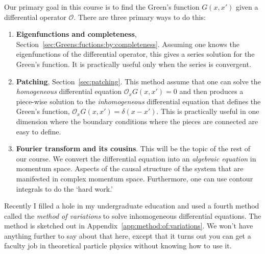 Our primary goal in this course is to find the Green's function $G(x,x')$ given a differential operator $\mathcal O$. There are three primary ways to do this:
\begin{enumerate}
\item \textbf{Eigenfunctions and completeness}, Section~\ref{sec:Greens:fuctions:by:completeness}. Assuming one knows the eigenfunctions of the differential operator, this gives a series solution for the Green's function. It is practically useful only when the series is convergent.

\item \textbf{Patching}, Section~\ref{sec:patching}. This method assume that one can solve the \emph{homogeneous} differential equation $\mathcal O_x G(x,x')=0$ and then produces a piece-wise solution to the \emph{inhomogeneous} differential equation that defines the Green's function, $\mathcal O_x G(x,x')=\delta(x-x')$. This is practically useful in one dimension where the boundary conditions where the pieces are connected are easy to define.

\item \textbf{Fourier transform and its cousins}. This will be the topic of the rest of our course. We convert the differential equation into an \emph{algebraic equation} in momentum space. Aspects of the causal structure of the system that are manifested in complex momentum space. Furthermore, one can use contour integrals to do the `hard work.'
\end{enumerate}

Recently I filled a hole in my undergraduate education and used a fourth method called the \emph{method of variations} to solve inhomogeneous differential equations. The method is sketched out in Appendix~\ref{app:method:of:variations}. We won't have anything further to say about that here, except that it turns out you can get a faculty job in theoretical particle physics without knowing how to use it.

